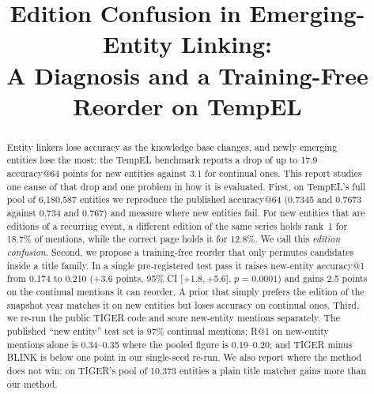 \documentclass[conference]{IEEEtran}
\newcommand{\ci}[2]{[#1,\,#2]}
\begin{document}
\title{Edition Confusion in Emerging-Entity Linking:\\
A Diagnosis and a Training-Free Reorder on TempEL}

\author{
\and
{}
\and
{}
}

\maketitle

\begin{abstract}
Entity linkers lose accuracy as the knowledge base changes, and newly emerging entities lose the most:
the TempEL benchmark reports a drop of up to 17.9 accuracy@64 points for new entities against 3.1 for
continual ones. This report studies one cause of that drop and one problem in how it is evaluated.
First, on TempEL's full pool of 6,180,587 entities we reproduce the published accuracy@64
(0.7345 and 0.7673 against 0.734 and 0.767) and measure where new entities fail. For new entities that
are editions of a recurring event, a different edition of the same series holds rank~1 for 18.7\% of
mentions, while the correct page holds it for 12.8\%. We call this \emph{edition confusion}.
Second, we propose a training-free reorder that only permutes candidates inside a title family. In a
single pre-registered test pass it raises new-entity accuracy@1 from 0.174 to 0.210
(+3.6 points, 95\% CI \ci{+1.8}{+5.6}, $p = 0.0001$) and gains 2.5 points on the continual mentions it
can reorder. A prior that simply prefers the edition of the snapshot year matches it on new entities
but loses accuracy on continual ones.
Third, we re-run the public TIGER code and score new-entity mentions separately. The published
``new entity'' test set is 97\% continual mentions; R@1 on new-entity mentions alone is 0.34--0.35 where
the pooled figure is 0.19--0.20; and TIGER minus BLINK is below one point in our single-seed re-run.
We also report where the method does not win: on TIGER's pool of 10,373 entities a plain title matcher
gains more than our method.
\end{abstract}
\end{document}
